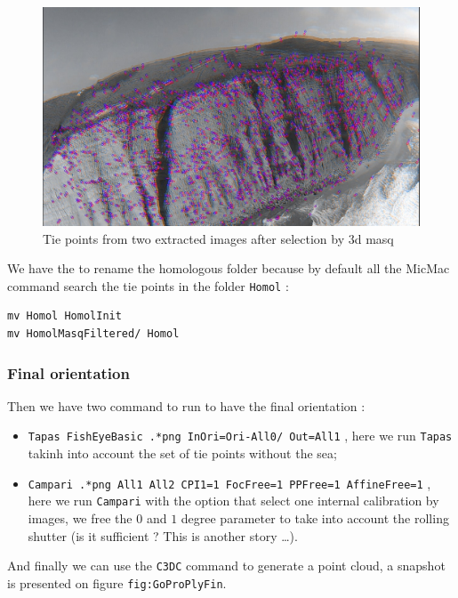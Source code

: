 \begin{figure}
\centering
\includegraphics[width=0.90\linewidth]{FIGS/GoProVideo/SIFT2.jpg}
\caption{Tie points from  two extracted images after selection by $3$d masq}
\label{fig:GoProSIFT2}
\end{figure}

We have the to rename the homologous folder because by default all the MicMac command search the tie points 
in the folder {\tt Homol} :

\begin{verbatim}
mv Homol HomolInit
mv HomolMasqFiltered/ Homol
\end{verbatim}

\subsubsection{Final orientation}

Then we have two command to run to have the final orientation :


\begin{itemize}
   \item {\tt Tapas   FishEyeBasic .*png InOri=Ori-All0/ Out=All1} , here we run {\tt Tapas} takinh into account
         the set of tie points without the sea;

   \item {\tt Campari  .*png  All1 All2 CPI1=1 FocFree=1 PPFree=1 AffineFree=1} , here we run {\tt Campari} with the option
         that select one internal calibration by images, we free the $0$ and $1$ degree parameter to take into account the
          rolling shutter (is it sufficient ? This is another story \dots).
\end{itemize}

And finally we can use the {\tt C3DC} command to generate a point cloud, a snapshot is presented on figure {\tt fig:GoProPlyFin}.

